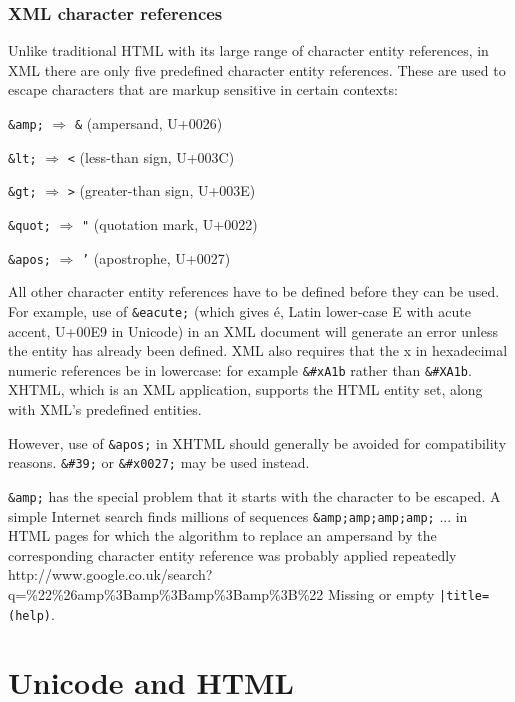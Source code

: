 \subsection{XML character references}

Unlike traditional HTML with its large range of character entity references, in XML there are only five predefined character entity references. These are used to escape characters that are markup sensitive in certain contexts:

\begin{compactitem}
\item \texttt{\&amp;} $\Longrightarrow$ \texttt{\&} (ampersand, U+0026)
\item \texttt{\&lt;} $\Longrightarrow$ \texttt{<} (less-than sign, U+003C)
\item \texttt{\&gt;} $\Longrightarrow$ \texttt{>} (greater-than sign, U+003E)
\item \texttt{\&quot;} $\Longrightarrow$ \texttt{"} (quotation mark, U+0022)
\item \texttt{\&apos;} $\Longrightarrow$ \texttt{'} (apostrophe, U+0027)
\end{compactitem}


All other character entity references have to be defined before they can be used. For example, use of \texttt{\&eacute;} (which gives é, Latin lower-case E with acute accent, U+00E9 in Unicode) in an XML document will generate an error unless the entity has already been defined. XML also requires that the x in hexadecimal numeric references be in lowercase: for example \texttt{\&\#xA1b} rather than \texttt{\&\#XA1b}. XHTML, which is an XML application, supports the HTML entity set, along with XML's predefined entities.

However, use of \texttt{\&apos;} in XHTML should generally be avoided for compatibility reasons. \texttt{\&\#39;} or \texttt{\&\#x0027;} may be used instead.

\texttt{\&amp;} has the special problem that it starts with the character to be escaped. A simple Internet search finds millions of sequences \texttt{\&amp;amp;amp;amp;} ... in HTML pages for which the algorithm to replace an ampersand by the corresponding character entity reference was probably applied repeatedly http://www.google.co.uk/search?q=\%22\%26amp\%3Bamp\%3Bamp\%3Bamp\%3B\%22 Missing or empty \texttt{|title= (help)}.


\chapter{Unicode and HTML}




